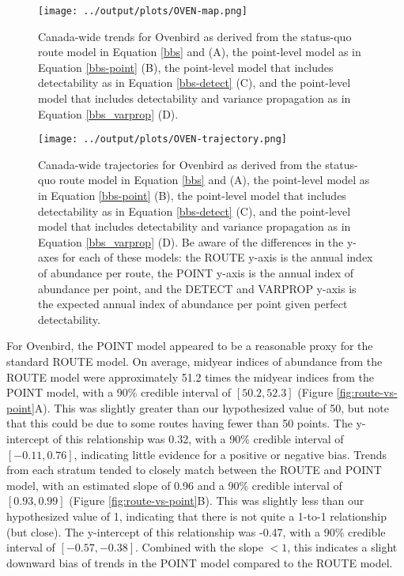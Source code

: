 \documentclass[12pt]{article}
\begin{document}
\begin{figure}[h]
	\texttt{[image: ../output/plots/OVEN-map.png]}
	\caption{Canada-wide trends for Ovenbird as derived from the status-quo route model in Equation \ref{bbs} and \citet{smith_spatially_2023} (A), the point-level model as in Equation \ref{bbs-point} (B), the point-level model that includes detectability as in Equation \ref{bbs-detect} (C), and the point-level model that includes detectability and variance propagation as in Equation \ref{bbs_varprop} (D).}
	\label{fig:oven-map}
\end{figure}

\begin{figure}[h]
	\texttt{[image: ../output/plots/OVEN-trajectory.png]}
	\caption{Canada-wide trajectories for Ovenbird as derived from the status-quo route model in Equation \ref{bbs} and \citet{smith_spatially_2023} (A), the point-level model as in Equation \ref{bbs-point} (B), the point-level model that includes detectability as in Equation \ref{bbs-detect} (C), and the point-level model that includes detectability and variance propagation as in Equation \ref{bbs_varprop} (D). Be aware of the differences in the y-axes for each of these models: the ROUTE y-axis is the annual index of abundance per route, the POINT y-axis is the annual index of abundance per point, and the DETECT and VARPROP y-axis is the expected annual index of abundance per point given perfect detectability.}
	\label{fig:oven-trajectories}
\end{figure}

\par For Ovenbird, the POINT model appeared to be a reasonable proxy for the standard ROUTE model.
On average, midyear indices of abundance from the ROUTE model were approximately 51.2 times the midyear indices from the POINT model, with a 90\% credible interval of $[50.2, 52.3]$ (Figure \ref{fig:route-vs-point}A).
This was slightly greater than our hypothesized value of 50, but note that this could be due to some routes having fewer than 50 points.
The y-intercept of this relationship was 0.32, with a 90\% credible interval of $[-0.11, 0.76]$, indicating little evidence for a positive or negative bias.
Trends from each stratum tended to closely match between the ROUTE and POINT model, with an estimated slope of 0.96 and a 90\% credible interval of $[0.93, 0.99]$ (Figure \ref{fig:route-vs-point}B).
This was slightly less than our hypothesized value of 1, indicating that there is not quite a 1-to-1 relationship (but close).
The y-intercept of this relationship was -0.47, with a 90\% credible interval of $[-0.57, -0.38]$.
Combined with the slope $< 1$, this indicates a slight downward bias of trends in the POINT model compared to the ROUTE model.
\end{document}
